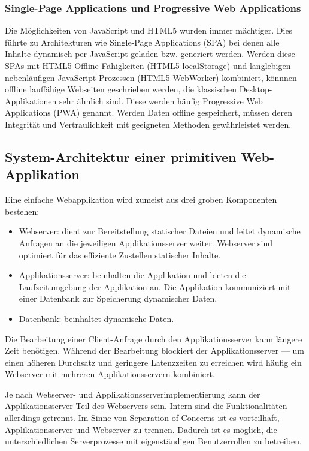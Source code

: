 \subsubsection{Single-Page Applications und Progressive Web Applications}

Die Möglichkeiten von JavaScript und HTML5 wurden immer mächtiger. Dies führte zu Architekturen wie Single-Page Applications (SPA) bei denen alle Inhalte dynamisch per JavaScript geladen bzw. generiert werden. Werden diese SPAs mit HTML5 Offline-Fähigkeiten (HTML5 localStorage) und langlebigen nebenläufigen JavaScript-Prozessen (HTML5 WebWorker) kombiniert, könnnen offline lauffähige Webseiten geschrieben werden, die klassischen Desktop-Applikationen  sehr ähnlich sind. Diese werden häufig Progressive Web Applications (PWA) genannt. Werden Daten offline gespeichert, müssen deren Integrität und Vertraulichkeit mit geeigneten Methoden gewährleistet werden.

\subsection{System-Architektur einer primitiven Web-Applikation}

Eine einfache Webapplikation wird zumeist aus drei groben Komponenten bestehen:

\begin{itemize}
	\item Webserver: dient zur Bereitstellung statischer Dateien und leitet dynamische Anfragen an die jeweiligen Applikationsserver weiter. Webserver sind optimiert für das effiziente Zustellen statischer Inhalte.
	\item Applikationsserver: beinhalten die Applikation und bieten die Laufzeitumgebung der Applikation an. Die Applikation kommuniziert mit einer Datenbank zur Speicherung dynamischer Daten.
	\item Datenbank: beinhaltet dynamische Daten.
\end{itemize}

Die Bearbeitung einer Client-Anfrage durch den Applikationsserver kann längere Zeit benötigen. Während der Bearbeitung blockiert der Applikationsserver --- um einen höheren Durchsatz und geringere Latenzzeiten zu erreichen wird häufig ein Webserver mit mehreren Applikationsservern kombiniert.

Je nach Webserver- und Applikationsserverimplementierung kann der Applikationsserver Teil des Webservers sein. Intern sind die Funktionalitäten allerdings getrennt. Im Sinne von Separation of Concerns ist es vorteilhaft, Applikationsserver und Webserver zu trennen. Dadurch ist es möglich, die unterschiedlichen Serverprozesse mit eigenständigen Benutzerrollen zu betreiben.

